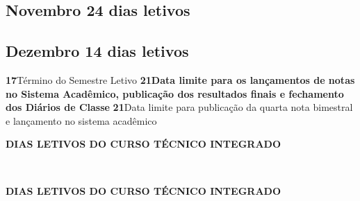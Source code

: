 \documentclass[thesis]{hmcposter}
\begin{document}
\begin{poster}
\subsection{Novembro \hfill 24 dias letivos}\subsection{Dezembro \hfill 14 dias letivos}\textbf{17}\qquad Término do Semestre Letivo \newline \null\textbf{21}\qquad \textbf{Data limite para os lançamentos de notas no Sistema Acadêmico, publicação dos resultados finais e fechamento dos Diários de Classe} \newline \null\textbf{21}\qquad Data limite para publicação da quarta nota bimestral e lançamento no sistema acadêmico \newline \null\newpage
~
\vfill
\begin{center}
\large \textbf{DIAS LETIVOS DO CURSO TÉCNICO INTEGRADO}
\newline
\null
\newline
\begin{table}
\centering
{}
\end{table}
\newline
\null
\newline
\end{center}
\vfill
\null
\columnbreak
~
\vfill
\begin{center}
\large \textbf{DIAS LETIVOS DO CURSO TÉCNICO INTEGRADO}
\newline
\null
\newline
\begin{table}
\centering
{}
\end{table}
\end{center}
\end{poster}
\end{document}
